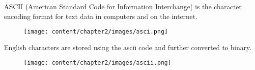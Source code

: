 
\begin{flushleft}
	
	ASCII (American Standard Code for Information Interchange) is the character encoding format for text data in computers and on the internet.
		
	\begin{figure}[h!]
			\centering
			\texttt{[image: content/chapter2/images/asci.png]}
	\end{figure}
	
	English characters are stored using the ascii code and further converted to binary.
	\begin{figure}[h!]
			\centering
			\texttt{[image: content/chapter2/images/ascii.png]}
	\end{figure}
	

		
\end{flushleft}

\newpage

